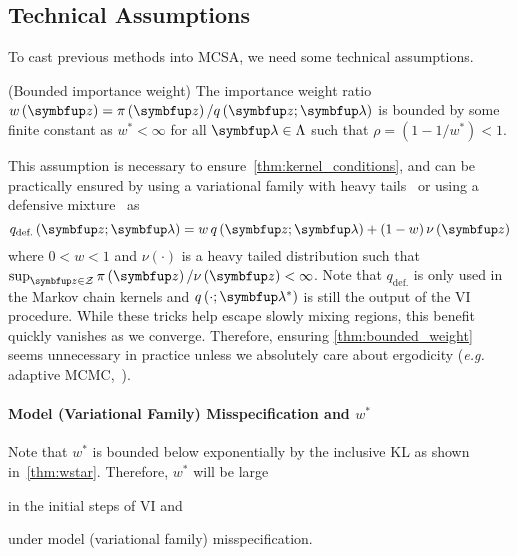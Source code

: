 \vspace{-0.1in}
\subsection{Technical Assumptions}\label{section:assumption}
\vspace{-0.07in}
To cast previous methods into MCSA, we need some technical assumptions.
\begin{assumption}{(Bounded importance weight)}\label{thm:bounded_weight}
  The importance weight ratio \(w\left(\vz\right) = \pi\left(\vz\right) / q\left(\vz; \vlambda\right)\) is bounded by some finite constant as \(w^* < \infty\) for all \(\vlambda \in \Lambda\) such that \(\rho = \left(1 - 1/w^*\right) < 1\).
\end{assumption}
\vspace{-0.05in}
This assumption is necessary to ensure~\cref{thm:kernel_conditions}, and can be practically ensured by using a variational family with heavy tails~\citep{NEURIPS2018_25db67c5} or using a defensive mixture~\citep{hesterberg_weighted_1995, holden_adaptive_2009} as
\vspace{-0.07in}
{\[
  q_{\text{def.}}\left(\vz; \vlambda \right) = w \, q\left(\vz; \vlambda\right) + (1 - w) \, \nu\left(\vz\right)
\]%
\vspace{-0.01in}}%
where \(0 < w < 1\) and \(\nu\left(\cdot\right)\) is a heavy tailed distribution such that \(\sup_{\vz \in \mathcal{Z}} \pi\left(\vz\right) / \nu\left(\vz\right) < \infty\).
Note that \(q_{\text{def.}}\) is only used in the Markov chain kernels and \(q\left(\cdot;\vlambda^*\right)\) is still the output of the VI procedure.
While these tricks help escape slowly mixing regions, this benefit quickly vanishes as we converge.
Therefore, ensuring \cref{thm:bounded_weight} seems unnecessary in practice unless we absolutely care about ergodicity (\textit{e.g.} adaptive MCMC,~\citealt{holden_adaptive_2009, pmlr-v151-brofos22a}).

\vspace{-0.1in}
\paragraph{\textbf{Model (Variational Family) Misspecification and \(w^*\)}}
Note that \(w^*\) is bounded below exponentially by the inclusive KL as shown in~\cref{thm:wstar}.
Therefore, \(w^*\) will be large 
\begin{enumerate*}[label=\textbf{(\roman*)}]
    \item in the initial steps of VI and
    \item under model (variational family) misspecification.
\end{enumerate*}

